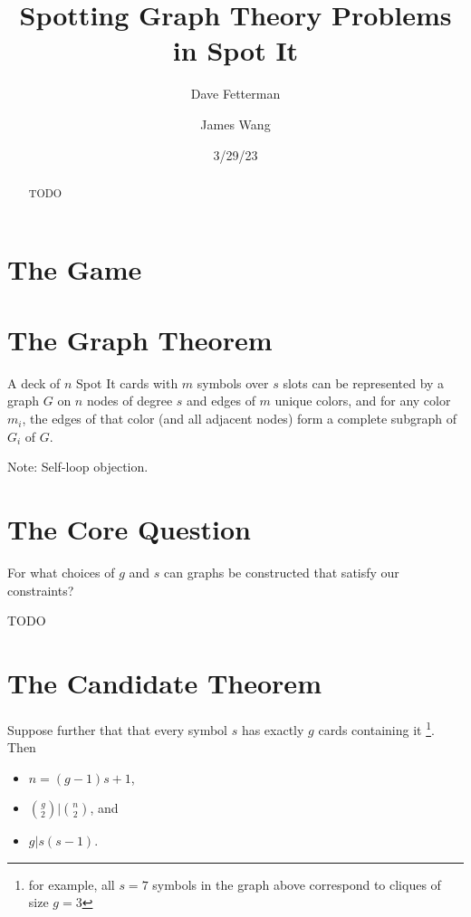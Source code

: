 \documentclass[11pt, oneside]{article} 	%
\title{Spotting Graph Theory Problems in Spot It}
\author[1]{Dave Fetterman}
\author[2]{James Wang}
\affil[1]{Obviously Unemployed}
\affil[2]{Surprisingly Employed}
\date{3/29/23}
\begin{document}
\maketitle

\begin{abstract}

TODO
\\

\end{abstract}

\section{The Game}

\section{The Graph Theorem}

\begin{framed}
A deck of $n$ Spot It cards with $m$ symbols over $s$ slots can be represented by a graph $G$ on $n$ nodes of degree $s$ and edges of $m$ unique colors, and for any color $m_i$, the edges of that color (and all adjacent nodes) form a complete subgraph of $G_i$ of $G$. 
\end{framed}

Note: Self-loop objection.

\section{The Core Question}

\begin{framed}
For what choices of $g$ and $s$ can graphs be constructed that satisfy our constraints? 
\end{framed}

TODO

\section{The Candidate Theorem}

\begin{framed}
Suppose further that that every symbol $s$ has exactly $g$ cards containing it \footnote{for example, all $s=7$ symbols in the graph above correspond to cliques of size $g=3$}.  Then \begin{itemize}
\item $n = (g-1)s + 1$, 
\item ${g \choose 2} | {n \choose 2}$, and 
\item $g | s(s-1)$.
\end{itemize}
\end{framed}
\end{document}
